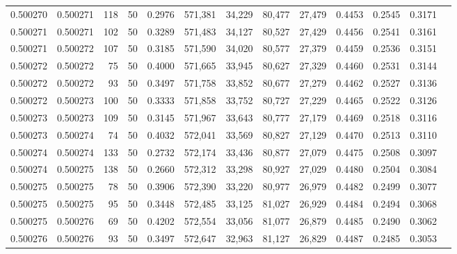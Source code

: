 \begin{tabular}{rrrrrrrrrrrrr}
0.500270 & 0.500271 &   118 &  50 &                                     0.2976 & 571,381 &  34,229 &  80,477 &  27,479 & 0.4453 & 0.2545 & 0.3171 \\
0.500271 & 0.500271 &   102 &  50 &                                     0.3289 & 571,483 &  34,127 &  80,527 &  27,429 & 0.4456 & 0.2541 & 0.3161 \\
0.500271 & 0.500272 &   107 &  50 &                                     0.3185 & 571,590 &  34,020 &  80,577 &  27,379 & 0.4459 & 0.2536 & 0.3151 \\
0.500272 & 0.500272 &    75 &  50 &                                     0.4000 & 571,665 &  33,945 &  80,627 &  27,329 & 0.4460 & 0.2531 & 0.3144 \\
0.500272 & 0.500272 &    93 &  50 &                                     0.3497 & 571,758 &  33,852 &  80,677 &  27,279 & 0.4462 & 0.2527 & 0.3136 \\
0.500272 & 0.500273 &   100 &  50 &                                     0.3333 & 571,858 &  33,752 &  80,727 &  27,229 & 0.4465 & 0.2522 & 0.3126 \\
0.500273 & 0.500273 &   109 &  50 &                                     0.3145 & 571,967 &  33,643 &  80,777 &  27,179 & 0.4469 & 0.2518 & 0.3116 \\
0.500273 & 0.500274 &    74 &  50 &                                     0.4032 & 572,041 &  33,569 &  80,827 &  27,129 & 0.4470 & 0.2513 & 0.3110 \\
0.500274 & 0.500274 &   133 &  50 &                                     0.2732 & 572,174 &  33,436 &  80,877 &  27,079 & 0.4475 & 0.2508 & 0.3097 \\
0.500274 & 0.500275 &   138 &  50 &                                     0.2660 & 572,312 &  33,298 &  80,927 &  27,029 & 0.4480 & 0.2504 & 0.3084 \\
0.500275 & 0.500275 &    78 &  50 &                                     0.3906 & 572,390 &  33,220 &  80,977 &  26,979 & 0.4482 & 0.2499 & 0.3077 \\
0.500275 & 0.500275 &    95 &  50 &                                     0.3448 & 572,485 &  33,125 &  81,027 &  26,929 & 0.4484 & 0.2494 & 0.3068 \\
0.500275 & 0.500276 &    69 &  50 &                                     0.4202 & 572,554 &  33,056 &  81,077 &  26,879 & 0.4485 & 0.2490 & 0.3062 \\
0.500276 & 0.500276 &    93 &  50 &                                     0.3497 & 572,647 &  32,963 &  81,127 &  26,829 & 0.4487 & 0.2485 & 0.3053 \\

\end{tabular}
